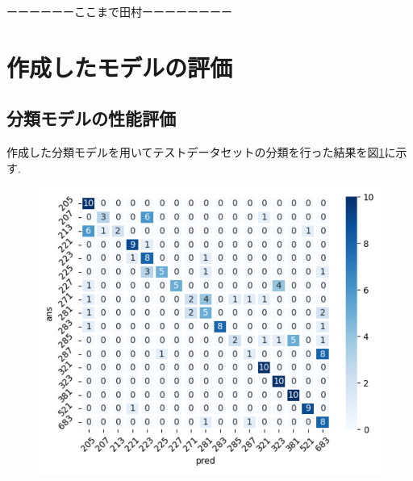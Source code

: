 \begin{multicols*}{2}

ーーーーーーここまで田村ーーーーーーーー

\section{作成したモデルの評価}

\subsection{分類モデルの性能評価}
作成した分類モデルを用いてテストデータセットの分類を行った結果を図\ref{fig:classifyresults}に示す.
\begin{figure}
	\centering
	\includegraphics[width=\linewidth]{obj/classify_results.pdf}
	\label{fig:classifyresults}
\end{figure}


\end{multicols*}
